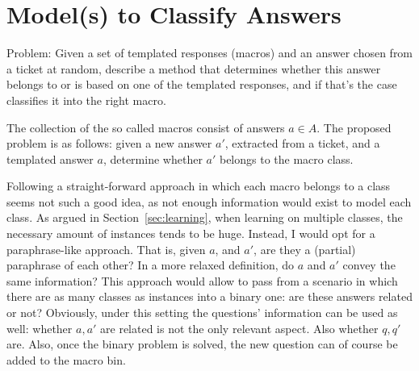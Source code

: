 \documentclass{sig-alternate-05-2015}
\begin{document}
% 
% 





\section{Model(s) to Classify Answers}
\label{sec:answers}

Problem: Given a set of templated responses (macros) and an answer chosen from a 
ticket at random, describe a method that determines whether this answer belongs 
to or is based on one of the templated responses, and if that's the case 
classifies it into the right macro.
\medskip

The collection of the so called macros consist of answers $a\in A$. The proposed 
problem is as follows: given a new answer $a'$, extracted from a ticket, and a 
templated answer $a$,  determine whether $a'$ belongs to the macro class. 

Following a straight-forward approach in which each macro belongs to a class 
seems not such a good idea, as not enough information would exist to model each 
class. As argued in Section~\ref{sec:learning}, when learning on multiple 
classes, the necessary amount of instances tends to be huge. Instead, I would 
opt for a paraphrase-like approach. That is, given $a$, and $a'$, are they a 
(partial) paraphrase of each other? In a more relaxed definition, do $a$ and 
$a'$ convey the same information? This approach would allow to pass from a 
scenario in which there are as many classes as instances into a binary one: are 
these answers related or not? Obviously, under this setting the questions' 
information can be used as well: whether $a,a'$ are related is not the only 
relevant aspect. Also whether $q,q'$ are. Also, once the binary problem is 
solved, the new question can of course be added to the macro bin.
\end{document}
